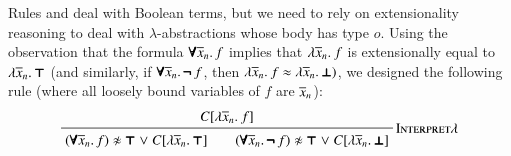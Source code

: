 
Rules  and  deal with Boolean terms,
but we need to rely on extensionality reasoning to deal with $\lambda$-abstractions
whose body has type $o$. Using the observation that the formula $\pmb{\forall} \overline{x}_{n}. \, f$ 
implies that $\lambda \overline{x}_{n}.\> f$ is extensionally equal to $\lambda \overline{x}_{n}.\> \pmb{\top}$ (and similarly, if
$\pmb{\forall} \overline{x}_{n}. \, \pmb{\neg\,} f$, then $\lambda \overline{x}_{n}.\> f \approx \lambda \overline{x}_{n}.\> \pmb{\bot})$, we
designed the following rule (where all loosely bound variables of $f$ are $\overline{x}_{n}$):
%
$$ \namedinference{Interpret$\lambda$}{C[\lam{\tuplen{x}}{f}]}
{(\iforall {\tuplen{x}}.\, f) \noteq \itrue \llor C[\lam{\tuplen{x}}{\itrue}] \qquad
(\iforall {\tuplen{x}}.\, \inot f) \noteq \itrue \llor C[\lam{\tuplen{x}}{\ifalse}]} $$
%

